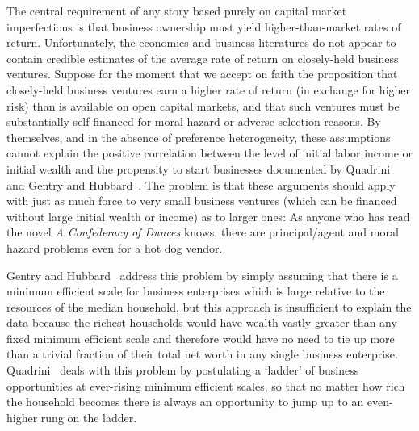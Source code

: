 \documentclass[12pt]{article}
\begin{document}
{\normalsize The central requirement of any story based purely on capital
market imperfections is that business ownership must yield
higher-than-market rates of return. Unfortunately, the economics and
business literatures do not appear to contain credible estimates of the
average rate of return on closely-held business ventures. Suppose for the
moment that we accept on faith the proposition that closely-held business
ventures earn a higher rate of return (in exchange for higher risk) than is
available on open capital markets, and that such ventures must be
substantially self-financed for moral hazard or adverse selection reasons.
By themselves, and in the absence of preference heterogeneity, these
assumptions cannot explain the positive correlation between the level of
initial labor income or initial wealth and the propensity to start
businesses documented by Quadrini~\cite{quadrini:entrepreneurship} and
Gentry and Hubbard~\cite{gentry&hubbard:wealthysave}. The problem is that
these arguments should apply with just as much force to very small business
ventures (which can be financed without large initial wealth or income) as
to larger ones: As anyone who has read the novel \textit{A Confederacy of
Dunces} knows, there are principal/agent and moral hazard problems even for
a hot dog vendor. }

{\normalsize Gentry and Hubbard~\cite{gentry&hubbard:wealthysave} address
this problem by simply assuming that there is a minimum efficient scale for
business enterprises which is large relative to the resources of the median
household, but this approach is insufficient to explain the data because the
richest households would have wealth vastly greater than any fixed minimum
efficient scale and therefore would have no need to tie up more than a
trivial fraction of their total net worth in any single business enterprise.
Quadrini~\cite{quadrini:entrepreneurship} deals with this problem by
postulating a `ladder' of business opportunities at ever-rising minimum
efficient scales, so that no matter how rich the household becomes there is
always an opportunity to jump up to an even-higher rung on the ladder. }
\end{document}
